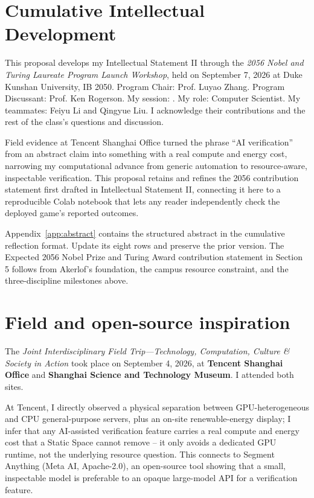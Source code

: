 \section{Cumulative Intellectual Development}
This proposal develops my Intellectual Statement II through the \emph{2056 Nobel and Turing Laureate Program Launch Workshop}, held on September 7, 2026 at Duke Kunshan University, IB 2050. Program Chair: Prof. Luyao Zhang. Program Discussant: Prof. Ken Rogerson. My session: \WorkshopSession. My role: Computer Scientist. My teammates: Feiyu Li and Qingyue Liu. I acknowledge their contributions and the rest of the class's questions and discussion.

Field evidence at Tencent Shanghai Office turned the phrase ``AI verification'' from an abstract claim into something with a real compute and energy cost, narrowing my computational advance from generic automation to resource-aware, inspectable verification. This proposal retains and refines the 2056 contribution statement first drafted in Intellectual Statement II, connecting it here to a reproducible Colab notebook that lets any reader independently check the deployed game's reported outcomes.

Appendix~\ref{app:abstract} contains the structured abstract in the cumulative reflection format. Update its eight rows and preserve the prior version. The Expected 2056 Nobel Prize and Turing Award contribution statement in Section 5 follows from Akerlof's foundation, the campus resource constraint, and the three-discipline milestones above.

\section{Field and open-source inspiration}
The \emph{Joint Interdisciplinary Field Trip---Technology, Computation, Culture \& Society in Action} took place on September 4, 2026, at \textbf{Tencent Shanghai Office} and \textbf{Shanghai Science and Technology Museum}. I attended both sites.

At Tencent, I directly observed a physical separation between GPU-heterogeneous and CPU general-purpose servers, plus an on-site renewable-energy display; I infer that any AI-assisted verification feature carries a real compute and energy cost that a Static Space cannot remove -- it only avoids a dedicated GPU runtime, not the underlying resource question. This connects to Segment Anything (Meta AI, Apache-2.0), an open-source tool showing that a small, inspectable model is preferable to an opaque large-model API for a verification feature.

